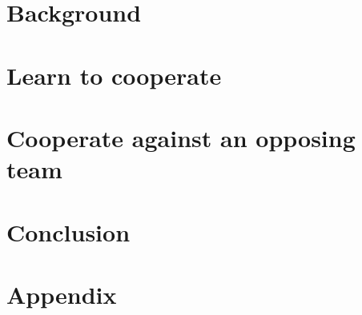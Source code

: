\documentclass[twoside,openright,titlepage,numbers=noenddot,headinclude,%
               footinclude=true,cleardoublepage=empty,abstractoff,BCOR=5mm,%
               paper=a4,fontsize=11pt,english,dvipsnames]{scrreprt}
\numberwithin{theorem}{chapter}
\numberwithin{definition}{chapter}
\numberwithin{algorithm}{chapter}
\numberwithin{figure}{chapter}
\numberwithin{table}{chapter}
\numberwithin{equation}{chapter}
\begin{document}
\usetikzlibrary{positioning, shapes.geometric, arrows.meta, calc}


\frenchspacing
\raggedbottom
{}
\pagestyle{plain}



\cleardoublepage
\cleardoublepage
\cleardoublepage
\cleardoublepage
\pagestyle{scrheadings}
\cleardoublepage



\cleardoublepage

\cleardoublepage
\part{Background}\label{part:background}
\cleardoublepage
\part{Learn to cooperate}\label{part:coop}
\cleardoublepage
\cleardoublepage
\cleardoublepage
\part{Cooperate against an opposing team}\label{part:compet}
\cleardoublepage
\cleardoublepage
\part{Conclusion}\label{part:conclusion}
\cleardoublepage

\cleardoublepage
\makeatletter
\def\toclevel@chapter{-1}
\makeatother



\appendix
\part{Appendix}
\cleardoublepage

\cleardoublepage
\end{document}
